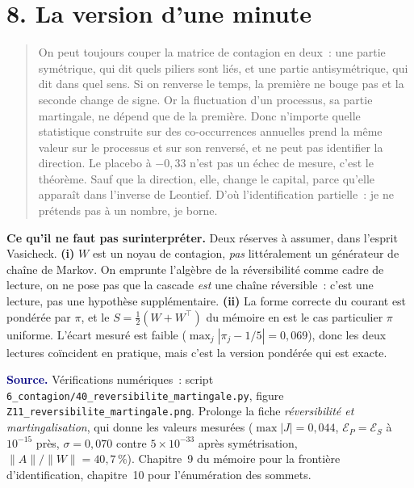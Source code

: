 \documentclass[11pt,a4paper]{article}
\theoremstyle{definition}
\newcommand{\T}{^{\top}}
\begin{document}
\section*{8. La version d'une minute}

\begin{quote}
\small
On peut toujours couper la matrice de contagion en deux~: une partie symétrique, qui dit
quels piliers sont liés, et une partie antisymétrique, qui dit dans quel sens. Si on
renverse le temps, la première ne bouge pas et la seconde change de signe. Or la
fluctuation d'un processus, sa partie martingale, ne dépend que de la première. Donc
n'importe quelle statistique construite sur des co-occurrences annuelles prend la même
valeur sur le processus et sur son renversé, et ne peut pas identifier la direction. Le
placebo à $-0{,}33$ n'est pas un échec de mesure, c'est le théorème. Sauf que la direction,
elle, change le capital, parce qu'elle apparaît dans l'inverse de Leontief. D'où
l'identification partielle~: je ne prétends pas à un nombre, je borne.
\end{quote}

\begin{cle}[colback=orange!8,colframe=orange!70!black]
\textbf{Ce qu'il ne faut pas surinterpréter.} Deux réserves à assumer, dans l'esprit
Vasicheck. \textbf{(i)} $W$ est un noyau de contagion, \emph{pas} littéralement un
générateur de chaîne de Markov. On emprunte l'algèbre de la réversibilité comme cadre de
lecture, on ne pose pas que la cascade \emph{est} une chaîne réversible~: c'est une
lecture, pas une hypothèse supplémentaire. \textbf{(ii)} La forme correcte du courant est
pondérée par $\pi$, et le $S=\tfrac12(W+W\T)$ du mémoire en est le cas particulier
$\pi$ uniforme. L'écart mesuré est faible ($\max_j|\pi_j-1/5|=0{,}069$), donc les deux
lectures coïncident en pratique, mais c'est la version pondérée qui est exacte.
\end{cle}

\smallskip
\sloppy
\noindent\footnotesize\textcolor{navy}{\textbf{Source.}} Vérifications numériques~:
script \texttt{6\_contagion/40\_reversibilite\_martingale.py}, figure
\texttt{Z11\_reversibilite\_martingale.png}. Prolonge la fiche
\emph{réversibilité et martingalisation}, qui donne les valeurs mesurées
($\max|J|=0{,}044$, $\mathcal{E}_P=\mathcal{E}_S$ à $10^{-15}$ près, $\sigma=0{,}070$
contre $5\times10^{-33}$ après symétrisation, $\|A\|/\|W\|=40{,}7\,\%$). Chapitre~9 du
mémoire pour la frontière d'identification, chapitre~10 pour l'énumération des sommets.
\end{document}
